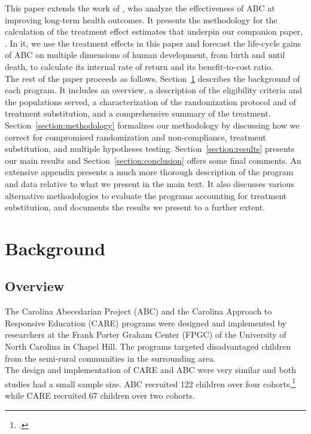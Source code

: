 \noindent This paper extends the work of \citet{Campbell_Conti_etal_2014_EarlyChildhoodInvestments}, who analyze the effectiveness of ABC at improving long-term health outcomes. It presents the methodology for the calculation of the treatment effect estimates that underpin our companion paper, \citet{Elango_et_al_2015_ABC_unpublished}. In it, we use the treatment effects in this paper and forecast the life-cycle gains of ABC on multiple dimensions of human development, from birth and until death, to calculate its internal rate of return and its benefit-to-cost ratio.\\

\noindent The rest of the paper proceeds as follows. Section~\ref{section:background} describes the background of each program. It includes an overview, a description of the eligibility criteria and the populations served, a characterization of the randomization protocol and of treatment substitution, and a comprehensive summary of the treatment.  Section~\ref{section:methodology} formalizes our methodology by discussing how we correct for compromised randomization and non-compliance, treatment substitution, and multiple hypotheses testing. Section~\ref{section:results} presents our main results and Section~\ref{section:conclusion} offers some final comments. An extensive appendix presents a much more thorough description of the program and data relative to what we present in the main text. It also discusses various alternative methodologies to evaluate the programs accounting for treatment substitution, and documents the results we present to a further extent.

\section{Background} \label{section:background}
\subsection{Overview}

\noindent The Carolina Abecedarian Project (ABC) and the Carolina Approach to Responsive Education (CARE) programs were designed and implemented by researchers at the Frank Porter Graham Center (FPGC) of the University of North Carolina in Chapel Hill. The programs targeted disadvantaged children from the semi-rural communities in the surrounding area.\\

\noindent The design and implementation of CARE and ABC were very similar and both studies had a small sample size. ABC recruited 122 children over four cohorts,\footnote{\citet{Ramey_Collier_etal_1976_CarolinaAbecedarianProject}.} while CARE recruited 67 children over two cohorts.\\  

